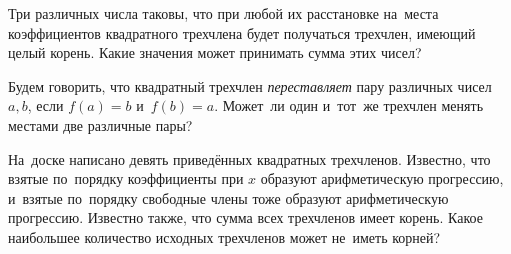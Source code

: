 \begin{problems}
\item
Три различных числа таковы, что при любой их расстановке на~места коэффициентов
квадратного трехчлена будет получаться трехчлен, имеющий целый корень.
Какие значения может принимать сумма этих чисел?

\item
Будем говорить, что квадратный трехчлен \emph{переставляет} пару различных
чисел $a, b$, если $f(a) = b$ и~$f(b) = a$.
Может~ли один и~тот~же трехчлен менять местами две различные пары?

\item
На~доске написано девять приведённых квадратных трехчленов.
Известно, что взятые по~порядку коэффициенты при $x$ образуют арифметическую
прогрессию, и~взятые по~порядку свободные члены тоже образуют арифметическую
прогрессию.
Известно также, что сумма всех трехчленов имеет корень.
Какое наибольшее количество исходных трехчленов может не~иметь корней?

\end{problems}

\endgroup %

